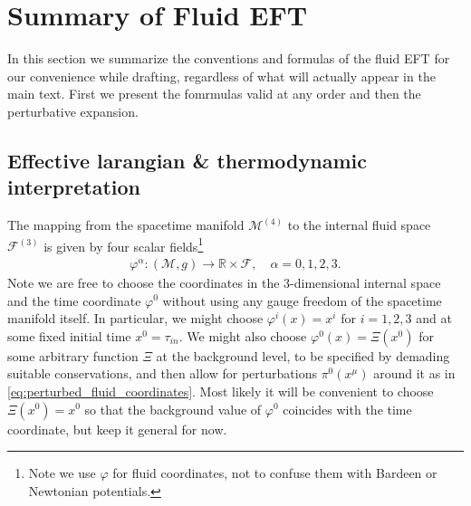 \section{Summary of Fluid EFT}
%
In this section we summarize the conventions and formulas of the fluid EFT for our convenience while drafting, regardless of what will actually appear in the main text.
First we present the fomrmulas valid at any order and then the perturbative expansion.


\subsection{Effective larangian \& thermodynamic interpretation}\label{sec:fluid_eft_exact}
%
The mapping from the spacetime manifold $\mathcal{M}^{(4)}$ to the internal fluid space $\mathcal{F}^{(3)}$ is given by four scalar fields\footnote{Note we use $\varphi$ for fluid coordinates, not to confuse them with Bardeen or Newtonian potentials.}  
{\small\begin{align}\label{eq:internal_coord_fluid}
    \varphi^{\alpha}:(\mathcal{M},g)\to \mathbb{R}\times \mathcal{F},\quad \alpha=0,1,2,3.
\end{align}}
Note we are free to choose the coordinates in the 3-dimensional internal space and the time coordinate $\varphi^0$ without using any gauge freedom of the spacetime manifold itself.
In particular, we might choose $\varphi^i(x)=x^i$ for $i=1,2,3$ and at some fixed initial time $x^0=\tau_{in}$.
We might also choose $\varphi^0(x)=\Xi(x^0)$ for some arbitrary function $\Xi$ at the background level, to be specified by demading suitable conservations, and then allow for perturbations $\pi^0(x^\mu)$ around it as in \eqref{eq:perturbed_fluid_coordinates}.
Most likely it will be convenient to choose $\Xi(x^0)=x^0$ so that the background value of $\varphi^0$ coincides with the time coordinate, but keep it general for now.

